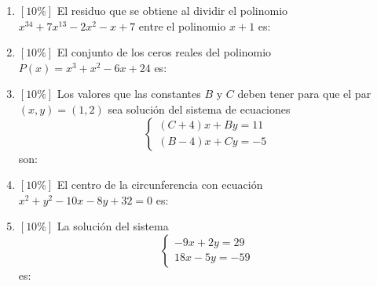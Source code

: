 \documentclass[11pt]{article}
\newcommand{\resp}{\par\vspace{2pt}\noindent\underline{\hspace{9cm}}\par\vspace{6pt}}
\begin{document}
\begin{enumerate}
\item $[10\%]$ El residuo que se obtiene al dividir el polinomio $x^{34} + 7x^{13} - 2x^2 - x + 7$ entre el polinomio $x + 1$ es:
\resp

\item $[10\%]$ El conjunto de los ceros reales del polinomio $P(x) = x^3 + x^2 - 6x + 24$ es:
\resp

\item $[10\%]$ Los valores que las constantes $B$ y $C$ deben tener para que el par $(x, y) = (1, 2)$ sea solución del sistema de ecuaciones
\[
\begin{cases}
(C + 4)x + By = 11 \\
(B - 4)x + Cy = -5
\end{cases}
\]
son:
\resp

\item $[10\%]$ El centro de la circunferencia con ecuación $x^2 + y^2 - 10x - 8y + 32 = 0$ es:
\resp

\item $[10\%]$ La solución del sistema
\[
\begin{cases}
-9x + 2y = 29 \\
18x - 5y = -59
\end{cases}
\]
es:
\resp
\end{enumerate}

\vfill
{}
\end{document}
